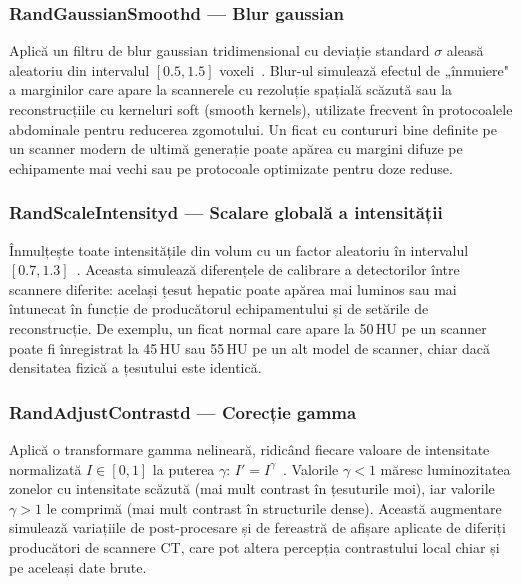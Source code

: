 \documentclass[12pt, a4paper]{report}
\begin{document}
\subsubsection{RandGaussianSmoothd — Blur gaussian}
\label{sec:gausssmooth}

Aplică un filtru de blur gaussian tridimensional cu deviație standard $\sigma$ aleasă aleatoriu
din intervalul $[0.5, 1.5]$ voxeli~\cite{isensee2019automated}. Blur-ul simulează efectul de „înmuiere" a marginilor
care apare la scannerele cu rezoluție spațială scăzută sau la reconstrucțiile cu kerneluri soft
(smooth kernels), utilizate frecvent în protocoalele abdominale pentru reducerea zgomotului.
Un ficat cu contururi bine definite pe un scanner modern de ultimă generație poate apărea
cu margini difuze pe echipamente mai vechi sau pe protocoale optimizate pentru doze reduse.

\subsubsection{RandScaleIntensityd — Scalare globală a intensității}
\label{sec:scaleintensity}

Înmulțește toate intensitățile din volum cu un factor aleatoriu în intervalul $[0.7, 1.3]$~\cite{isensee2019automated}.
Aceasta simulează diferențele de calibrare a detectorilor între scannere diferite:
același țesut hepatic poate apărea mai luminos sau mai întunecat în funcție de producătorul
echipamentului și de setările de reconstrucție. De exemplu, un ficat normal care apare
la 50\,HU pe un scanner poate fi înregistrat la 45\,HU sau 55\,HU pe un alt model de scanner,
chiar dacă densitatea fizică a țesutului este identică.

\subsubsection{RandAdjustContrastd — Corecție gamma}
\label{sec:adjustcontrast}

Aplică o transformare gamma nelineară, ridicând fiecare valoare de intensitate normalizată
$I \in [0, 1]$ la puterea $\gamma$: $I' = I^{\gamma}$~\cite{isensee2019automated}.
Valorile $\gamma < 1$ măresc luminozitatea zonelor cu intensitate scăzută (mai mult contrast
în țesuturile moi), iar valorile $\gamma > 1$ le comprimă (mai mult contrast în structurile dense).
Această augmentare simulează variațiile de post-procesare și de fereastră de afișare aplicate
de diferiți producători de scannere CT, care pot altera percepția contrastului local
chiar și pe aceleași date brute.
\end{document}
